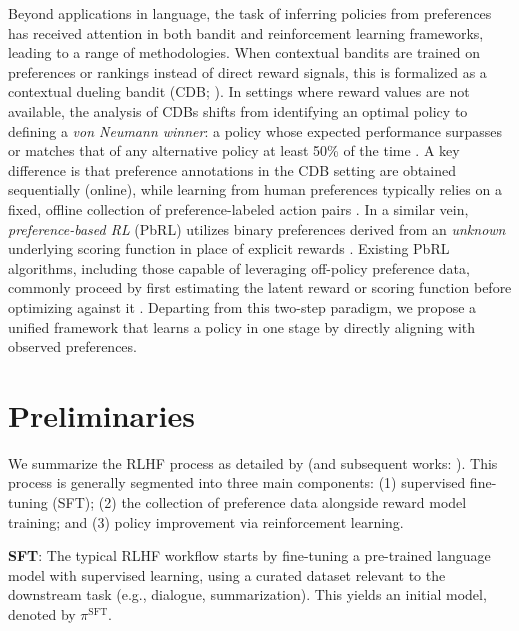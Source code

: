 Beyond applications in language, the task of inferring policies from preferences has received attention in both bandit and reinforcement learning frameworks, leading to a range of methodologies. When contextual bandits are trained on preferences or rankings instead of direct reward signals, this is formalized as a contextual dueling bandit (CDB; \cite{yue2012karmed,dudik2015contextual}). In settings where reward values are not available, the analysis of CDBs shifts from identifying an optimal policy to defining a \textit{von Neumann winner}: a policy whose expected performance surpasses or matches that of any alternative policy at least 50\% of the time \citep{dudik2015contextual}. A key difference is that preference annotations in the CDB setting are obtained sequentially (online), while learning from human preferences typically relies on a fixed, offline collection of preference-labeled action pairs \citep{yan2022human}. In a similar vein, \textit{preference-based RL} (PbRL) utilizes binary preferences derived from an \textit{unknown} underlying scoring function in place of explicit rewards \citep{BusaFekete2014,ruiz2023dueling}. Existing PbRL algorithms, including those capable of leveraging off-policy preference data, commonly proceed by first estimating the latent reward or scoring function before optimizing against it \citep{jain2013learning,BusaFekete2014,christiano2017deep,sadigh2017active,kupcsik2018learning}. Departing from this two-step paradigm, we propose a unified framework that learns a policy in one stage by directly aligning with observed preferences.

\section{Preliminaries}\label{section:prelims}

We summarize the RLHF process as detailed by \citeauthor{ziegler2020finetuning} (and subsequent works: \citep{stiennon2022learning, bai2022training, ouyang2022training}). This process is generally segmented into three main components: (1) supervised fine-tuning (SFT); (2) the collection of preference data alongside reward model training; and (3) policy improvement via reinforcement learning.

\textbf{SFT}: The typical RLHF workflow starts by fine-tuning a pre-trained language model with supervised learning, using a curated dataset relevant to the downstream task (e.g., dialogue, summarization). This yields an initial model, denoted by $\pi^\text{SFT}$.


